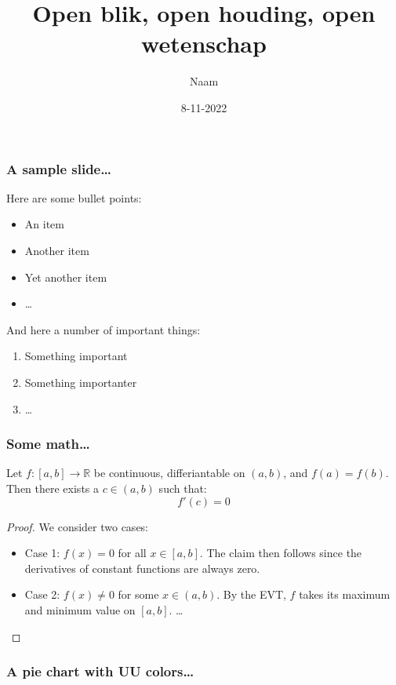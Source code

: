 \documentclass[10pt]{beamer}
\title{Open blik, open houding, open wetenschap}
\author{Naam}
\institute{functie}
\date{8-11-2022}
\begin{document}
\frame{\titlepage}

\begin{frame}
  \frametitle{A sample slide\dots}

  Here are some bullet points:

  \begin{itemize}
    \item An item
    \item Another item
    \item Yet another item
    \item \dots
  \end{itemize}

  And here a number of important things:

  \begin{enumerate}
    \item Something important
    \item Something importanter
    \item \dots
  \end{enumerate}

\end{frame}

\begin{frame}
  \frametitle{Some math\dots}

\begin{theorem}[Rolle]
  Let $f:[a,b]\to\mathbb{R}$ be continuous, differiantable on $(a,b)$, and
  $f(a)=f(b)$. Then there exists a $c\in (a,b)$ such that:
  \[f'(c)=0\]
\end{theorem}

\begin{proof}
We consider two cases:

\begin{itemize}
  \item Case 1: $f(x)=0$ for all $x\in [a,b]$. The claim then follows since the
    derivatives of constant functions are always zero.
  \item Case 2: $f(x)\neq 0$ for some $x\in(a,b)$. By the EVT, $f$ takes its
    maximum and minimum value on $[a,b]$. \dots
\end{itemize}


\end{proof}


\end{frame}

\begin{frame}
  \frametitle{A pie chart with UU colors\dots}

  \begin{center}
  \end{center}

\end{frame}
\end{document}
